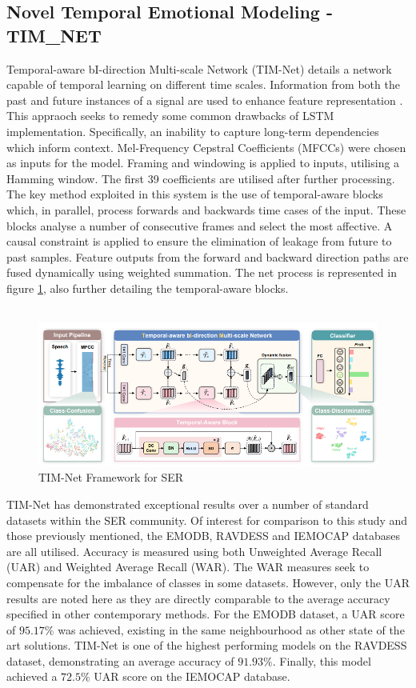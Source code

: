 \subsection{Novel Temporal Emotional Modeling - TIM\_NET}
Temporal-aware bI-direction Multi-scale Network (TIM-Net) details a network capable of temporal learning on different time scales. Information from both the past and future instances of a signal are used to enhance feature representation \cite{ye2023temporal}. This appraoch seeks to remedy some common drawbacks of LSTM implementation. Specifically, an inability to capture long-term dependencies which inform context. Mel-Frequency Cepstral Coefficients (MFCCs) were chosen as inputs for the model. Framing and windowing is applied to inputs, utilising a Hamming window. The first 39 coefficients are utilised after further processing. The key method exploited in this system is the use of temporal-aware blocks which, in parallel, process forwards and backwards time cases of the input. These blocks analyse a number of consecutive frames and select the most affective. A causal constraint is applied to ensure the elimination of leakage from future to past samples. Feature outputs from the forward and backward direction paths are fused dynamically using weighted summation. The net process is represented in figure \ref{timnet_fig}, also further detailing the temporal-aware blocks.\\ \\
\begin{figure}[ht]
        \centering
        \includegraphics[scale = 0.8]{images/TIM_NET_fig.png}
        \caption{TIM-Net Framework for SER \cite{ye2023temporal}}
        \label{timnet_fig}
\end{figure}
TIM-Net has demonstrated exceptional results over a number of standard datasets within the SER community. Of interest for comparison to this study and those previously mentioned, the EMODB, RAVDESS and IEMOCAP databases are all utilised. Accuracy is measured using both Unweighted Average Recall (UAR) and Weighted Average Recall (WAR). The WAR measures seek to compensate for the imbalance of classes in some datasets. However, only the UAR results are noted here as they are directly comparable to the average accuracy specified in other contemporary methods. For the EMODB dataset, a UAR score of $95.17\%$ was achieved, existing in the same neighbourhood as other state of the art solutions. TIM-Net is one of the highest performing models on the RAVDESS dataset, demonstrating an average accuracy of $91.93\%$. Finally, this model achieved a $72.5\%$ UAR score on the IEMOCAP database. 


